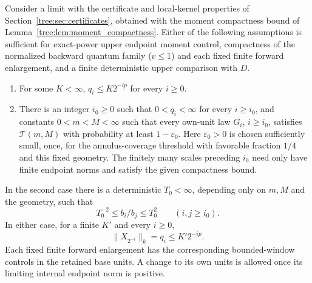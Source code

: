 \begin{proposition}\label{tree:prop:comparison_families}
Consider a limit with the certificate and local-kernel properties of
Section~\ref{tree:sec:certificates}, obtained with the moment compactness
bound of Lemma~\ref{tree:lem:moment_compactness}.  Either of the following
assumptions is sufficient for exact-power upper endpoint moment
control, compactness of the normalized backward quantum family
($v\le1$) and each fixed finite forward enlargement, and a finite
deterministic upper comparison with $D$.
\begin{enumerate}
\item For some $K<\infty$, $q_i\le K2^{-ip}$ for every $i\ge0$.
\item There is an integer $i_0\ge0$ such that $0<q_i<\infty$ for every
$i\ge i_0$, and constants $0<m<M<\infty$ such that every own-unit law
$G_i$, $i\ge i_0$, satisfies $\mathcal T(m,M)$ with probability at least
$1-\varepsilon_0$.  Here $\varepsilon_0>0$ is chosen sufficiently
small, once, for the annulus-coverage threshold with favorable fraction
$1/4$ and this fixed geometry.  The finitely many scales preceding
$i_0$ need only have finite endpoint norms and satisfy the given
compactness bound.
\end{enumerate}
In the second case there is a deterministic $T_0<\infty$, depending
only on $m,M$ and the geometry, such that
\begin{equation}\label{tree:eq:b_comparability}
 T_0^{-2}\le b_i/b_j\le T_0^2\qquad(i,j\ge i_0).
\end{equation}
In either case, for a finite $K'$ and every $i\ge0$,
\begin{equation}\label{tree:eq:exact_power_endpoint}
 \|X_{2^{-i}}\|_k=q_i\le K'2^{-ip}.
\end{equation}
Each fixed finite forward enlargement has the corresponding
bounded-window controls in the retained base units. A change to its
own units is allowed once its limiting internal endpoint norm is
positive.
\end{proposition}

